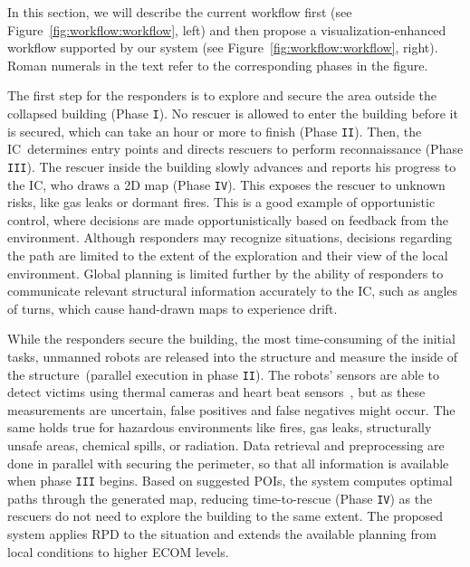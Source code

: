 \documentclass{egpubl}
\def\IC{IC}
\begin{document}
In this section, we will describe the current workflow first (see Figure~\ref{fig:workflow:workflow}, left) and then propose a visualization-enhanced workflow supported by our system (see Figure~\ref{fig:workflow:workflow}, right). Roman numerals in the text refer to the corresponding phases in the figure.

 The first step for the responders is to explore and secure the area outside the collapsed building (Phase \texttt{I}). No rescuer is allowed to enter the building before it is secured, which can take an hour or more to finish (Phase \texttt{II}). Then, the \IC\ determines entry points and directs rescuers to perform reconnaissance (Phase \texttt{III}). The rescuer inside the building slowly advances and reports his progress to the \IC, who draws a 2D map (Phase \texttt{IV}). This exposes the rescuer to unknown risks, like gas leaks or dormant fires. This is a good example of opportunistic control, where decisions are made opportunistically based on feedback from the environment. Although responders may recognize situations, decisions regarding the path are limited to the extent of the exploration and their view of the local environment. Global planning is limited further by the ability of responders to communicate relevant structural information accurately to the \IC, such as angles of turns, which cause hand-drawn maps to experience drift.

 While the responders secure the building, the most time-consuming of the initial tasks, unmanned robots are released into the structure and measure the inside of the structure~(parallel execution in phase \texttt{II}). The robots' sensors are able to detect victims using thermal cameras and heart beat sensors~\cite{6027084}, but as these measurements are uncertain, false positives and false negatives might occur. The same holds true for hazardous environments like fires, gas leaks, structurally unsafe areas, chemical spills, or radiation. Data retrieval and preprocessing are done in parallel with securing the perimeter, so that all information is available when phase \texttt{III} begins. Based on suggested POIs, the system computes optimal paths through the generated map, reducing time-to-rescue (Phase \texttt{IV}) as the rescuers do not need to explore the building to the same extent. The proposed system applies RPD to the situation and extends the available planning from local conditions to higher ECOM levels.
\end{document}

